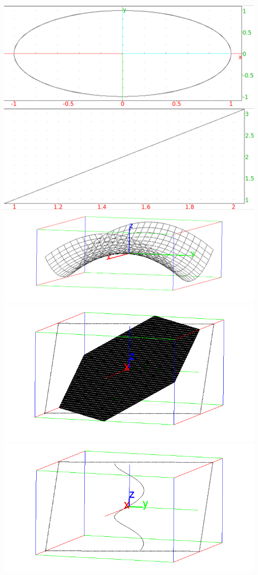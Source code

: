 \documentclass{article}
\begin{document}
\includegraphics[width=\textwidth]{./xcas-plotparam.png}
\clearpage%
\includegraphics[width=\textwidth]{./xcas-tangent.png}
\clearpage%
\includegraphics[width=\textwidth]{./xcas-3dplot.png}
\clearpage%
\includegraphics[width=\textwidth]{./xcas-3dparam.png}
\clearpage%
\includegraphics[width=\textwidth]{./xcas-3dcurve.png}
\clearpage%
\end{document}
